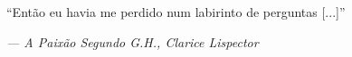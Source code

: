 \vspace*{\fill}
\begin{minipage}{\textwidth}
\center
{
“Então eu havia me perdido num labirinto de perguntas [...]”
}\\
\vspace{2ex}
\begin{flushright}\textit{--- A Paixão Segundo G.H., Clarice Lispector}\end{flushright}
\end{minipage}
\vspace{\fill}